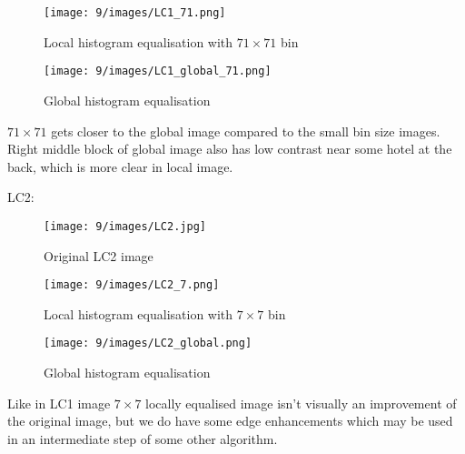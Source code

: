 \documentclass[12pt]{article}
\begin{document}
\begin{itemize}
    \begin{figure}[H]
        \centering
        \begin{minipage}{.45\textwidth}
          \centering
          \texttt{[image: 9/images/LC1\_71.png]}
          \caption*{Local histogram equalisation with $71\times 71$ bin}
          \label{fig:totalpowervst}
        \end{minipage}
        \begin{minipage}{.45\textwidth}
          \centering
          \texttt{[image: 9/images/LC1\_global\_71.png]}
          \caption*{Global histogram equalisation}
          \label{fig:totalpower2}
        \end{minipage}
        \label{fig:totalPower}
    \end{figure}
    $71\times 71$ gets closer to the global image compared to the small bin size images. Right middle block of global image also has low contrast near some hotel at the back, which is more clear in local image.
    \newpage
  
    LC2:\\[10pt]
    \begin{figure}[H]
        \centering
        \begin{minipage}{.45\textwidth}
          \centering
          \texttt{[image: 9/images/LC2.jpg]}
          \caption*{Original LC2 image}
        \end{minipage}
    \end{figure}
        
    \begin{figure}[H]
        \centering
        \begin{minipage}{.45\textwidth}
          \centering
          \texttt{[image: 9/images/LC2\_7.png]}
          \caption*{Local histogram equalisation with $7\times 7$ bin}
          \label{fig:totalpowervst}
        \end{minipage}
        \begin{minipage}{.45\textwidth}
          \centering
          \texttt{[image: 9/images/LC2\_global.png]}
          \caption*{Global histogram equalisation}
          \label{fig:totalpower2}
        \end{minipage}
        \label{fig:totalPower}
    \end{figure}
    Like in LC1 image $7\times 7$ locally equalised image isn't visually an improvement of the original image, but we do have some edge enhancements which may be used in an intermediate step of some other algorithm.
    

\end{itemize}
\end{document}
